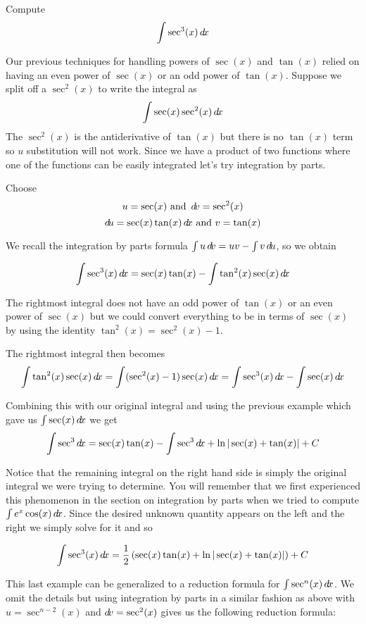 \documentclass{ximera}
\begin{document}
\begin{example}
Compute 
\[
\int \sec^{3}(x) \mathop{}\!d\! x 
\]
\begin{explanation}
Our previous techniques for handling powers of $\sec(x)$ and $\tan(x)$ relied on having an even power of $\sec(x)$ or an odd power of $\tan(x)$. 
Suppose we split off a $\sec^{2}(x)$ to write the integral as 
\[
 \int \sec(x) \sec^{2}(x) \mathop{}\!d\! x
\]
The $\sec^{2}(x)$ is the antiderivative of $\tan(x)$ but there is no $\tan(x)$ term so $u$ substitution will not work. Since we have a product of two functions where one 
of the functions can be easily integrated let's try integration by parts. 

Choose
\[ 
u= \sec(x) \text{  and  } \mathop{}\!d\! v=\sec^{2}(x) \\
\] 
\[
\mathop{}\!d\! u=  \sec(x)\tan(x) \mathop{}\!d\! x \text{  and  } v=\tan(x) 
\]

We recall the integration by parts formula $\int u \mathop{}\!d\! v=uv-\int v \mathop{}\!d\! u$, so we obtain

\[
\int \sec^{3}(x) \mathop{}\!d\! x=\sec(x)\tan(x) - \int \tan^{2}(x)\sec(x)\mathop{}\!d\! x
\]

The rightmost integral does not have an odd power of $\tan(x)$ or an even power of $\sec(x)$ but we could convert 
everything to be in terms of $\sec(x)$ by using the identity $\tan^{2}(x)=\sec^{2}(x)-1$. 

The rightmost integral then becomes
\[
\int \tan^{2}(x)\sec(x) \d x=\int (\sec^{2}(x)-1) \sec(x) \d x= \int \sec^{3}(x)\d x - \int \sec(x) \d x
\]

Combining this with our original integral and using the previous example which gave us $\int \sec(x) \mathop{}\!d\! x$ we get
\[
\int \sec^{3} \mathop{}\!d\! x=\sec(x) \tan(x)- \int \sec^{3} \mathop{}\!d\! x + \ln| \sec(x)+\tan(x) | + C
\]

Notice that the remaining integral on the right hand side is simply the original integral we were trying to determine. You will remember that we first experienced this phenomenon in the section on integration by parts when we tried to compute $\int e^{x}\cos(x) \mathop{}\!d\! x$. 
Since the desired unknown quantity appears on the left and the right we simply solve for it and so

\[
\int \sec^{3}(x) \mathop{}\!d\! x=\frac{1}{2}\left(\sec(x) \tan(x) + \ln | \sec(x) + \tan(x)|  \right)  + C
\]
\end{explanation}
\end{example}

This last example can be generalized to a reduction formula for $\int \sec^{n}(x) \mathop{}\!d\! x$. We omit the details but using integration by parts in a similar fashion
as above with $u=\sec^{n-2}(x)$ and $\mathop{}\!d\! v=\sec^{2}(x)$ gives us the following reduction formula:
\end{document}
